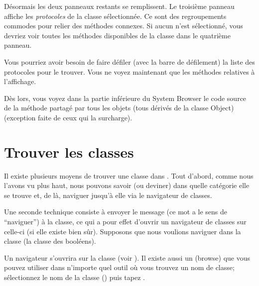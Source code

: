 \documentclass[a4paper,10pt,twoside]{book}
\begin{document}
D\'esormais les deux panneaux restants se remplissent.
Le troisi\`eme panneau affiche les \emph{protocoles} de la classe
s\'electionn\'ee.
Ce sont des regroupements commodes pour relier des m\'ethodes
connexes. Si aucun  n'est s\'electionn\'e, vous devriez
voir toutes les m\'ethodes disponibles de la classe dans le
quatri\`eme panneau.

Vous pourriez avoir besoin de faire d\'efiler (avec la barre de
d\'efilement) la liste des protocoles pour le trouver.
Vous ne voyez maintenant que les m\'ethodes relatives \`a
l'affichage.

D\`es lors, vous voyez dans la partie inf\'erieure du System Browser
le code source de la m\'ethode  partag\'e par tous
les objets 
(tous dérivés de la classe Object)
(exception faite de ceux qui la surcharge).

\section{Trouver les classes}

Il existe plusieurs moyens de trouver une classe dans \sq.
Tout d'abord, comme nous l'avons vu plus haut, nous pouvons savoir (ou
deviner) dans quelle cat\'egorie elle se trouve et, de l\`a, naviguer
jusqu'\`a elle via le navigateur de classes.

Une seconde technique consiste \`a envoyer le message 
(ce mot a le sens de ``naviguer'') \`a la classe, ce qui a pour effet
d'ouvrir un navigateur de classes sur celle-ci
(si elle existe bien s\^ur).
Supposons que nous voulions naviguer dans la classe 
(la classe des bool\'eens).

Un navigateur s'ouvrira sur la classe  (voir ).
Il existe aussi un   (browse) que vous
pouvez utiliser dans n'importe quel outil o\`u vous trouvez un nom de
classe;
s\'electionnez le nom de la classe 
(\parex {})
puis tapez .
\end{document}
